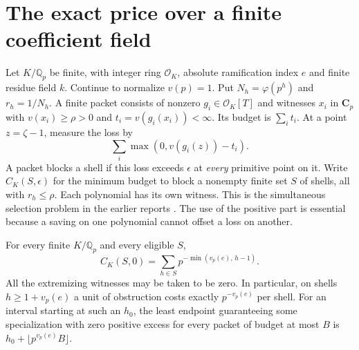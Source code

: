 \section{The exact price over a finite coefficient field}
\label{sec:field}
Let $K/\mathbb Q_p$ be finite, with integer ring $\mathcal O_K$, absolute ramification index $e$ and finite residue field $k$. Continue to normalize $v(p)=1$. Put $N_h=\varphi(p^h)$ and $r_h=1/N_h$. A finite packet consists of nonzero $g_i\in\mathcal O_K[T]$ and witnesses $x_i$ in $\mathbf C_p$ with $v(x_i)\ge\rho>0$ and $t_i=v(g_i(x_i))<\infty$. Its budget is $\sum_i t_i$. At a point $z=\zeta-1$, measure the loss by
\[
                   \sum_i \max(0,v(g_i(z))-t_i).
\]
A packet blocks a shell if this loss exceeds $\epsilon$ at \emph{every} primitive point on it. Write $C_K(S,\epsilon)$ for the minimum budget to block a nonempty finite set $S$ of shells, all with $r_h\le\rho$. Each polynomial has its own witness. This is the simultaneous selection problem in the earlier reports \cite{packet,fieldprior}. The use of the positive part is essential because a saving on one polynomial cannot offset a loss on another.

\begin{theorem}\label{th:ram}
For every finite $K/\mathbb Q_p$ and every eligible $S$,
\[
 \boxed{\quad C_K(S,0)=\sum_{h\in S}p^{-\min(v_p(e),\,h-1)}.\quad}
\]
All the extremizing witnesses may be taken to be zero. In particular, on shells $h\ge1+v_p(e)$ a unit of obstruction costs exactly $p^{-v_p(e)}$ per shell. For an interval starting at such an $h_0$, the least endpoint guaranteeing some specialization with zero positive excess for every packet of budget at most $B$ is $h_0+\lfloor p^{v_p(e)}B\rfloor$.
\end{theorem}

